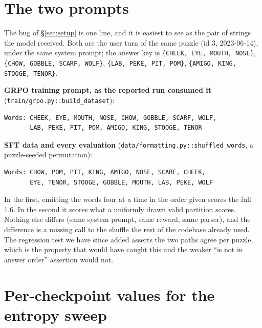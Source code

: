 \documentclass{article}
\begin{document}
\appendix

\section{The two prompts}
\label{app:prompts}

The bug of \S\ref{sec:setup} is one line, and it is easiest to see as the
pair of strings the model received. Both are the user turn of the
same puzzle (id 3, 2023-06-14), under the same system prompt; the answer key
is \texttt{\{CHEEK, EYE, MOUTH, NOSE\}}, \texttt{\{CHOW, GOBBLE, SCARF,
WOLF\}}, \texttt{\{LAB, PEKE, PIT, POM\}}, \texttt{\{AMIGO, KING, STOOGE,
TENOR\}}.

\medskip
\noindent\textbf{GRPO training prompt, as the reported run consumed it}
(\texttt{train/grpo.py::build\_dataset}):

{\footnotesize\begin{verbatim}
Words: CHEEK, EYE, MOUTH, NOSE, CHOW, GOBBLE, SCARF, WOLF,
       LAB, PEKE, PIT, POM, AMIGO, KING, STOOGE, TENOR
\end{verbatim}}

\noindent\textbf{SFT data and every evaluation}
(\texttt{data/formatting.py::shuffled\_words}, a puzzle-seeded permutation):

{\footnotesize\begin{verbatim}
Words: CHOW, POM, PIT, KING, AMIGO, NOSE, SCARF, CHEEK,
       EYE, TENOR, STOOGE, GOBBLE, MOUTH, LAB, PEKE, WOLF
\end{verbatim}}

\medskip
In the first, emitting the words four at a time in the order given scores
the full 1.6. In the second it scores what a uniformly drawn valid
partition scores. Nothing else differs (same system prompt, same reward,
same parser), and the difference is a missing call to the shuffle the
rest of the codebase already used. The regression test we have since added
asserts the two paths agree per puzzle, which is the property that would
have caught this and the weaker ``is not in answer order'' assertion would
not.

\section{Per-checkpoint values for the entropy sweep}
\label{app:ckpt}
\end{document}
